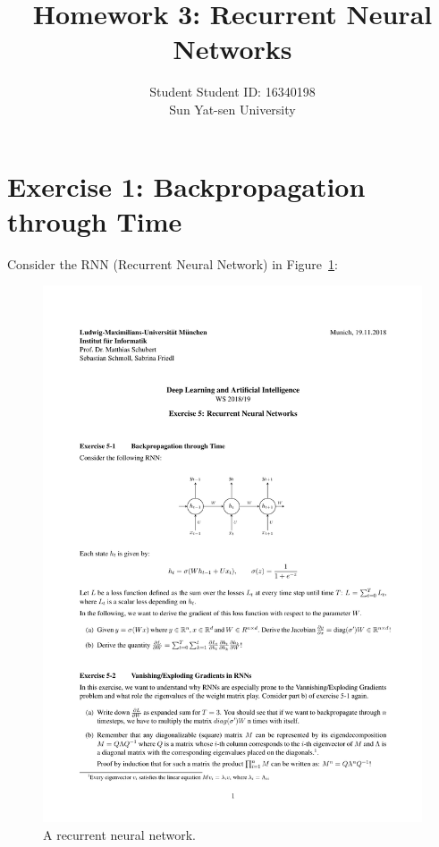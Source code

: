 \documentclass[12pt]{article}
\begin{document}
 
 
\title{\textbf{Homework 3: Recurrent Neural Networks}}
\author{Student   \hspace{2in} Student ID: 16340198\\ Sun Yat-sen University}

\date{}
\maketitle
\section{\begingroup \large Exercise 1: Backpropagation through Time \endgroup}
\noindent Consider the RNN (Recurrent Neural Network) in Figure~\ref{fig:rnn}:
\begin{figure}[h]
\label{fig:rnn}
\centering
\includegraphics[scale=1.2]{rnn.pdf}
\vspace{-1em}
\caption{A recurrent neural network.}
\end{figure}
\end{document}
